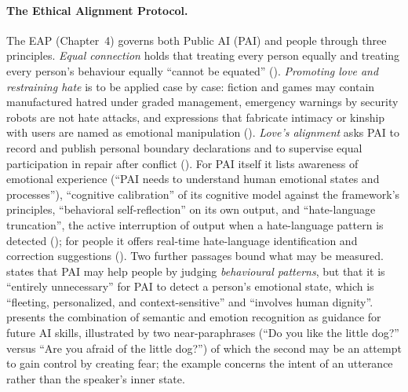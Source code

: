 \paragraph{The Ethical Alignment Protocol.}
The EAP (Chapter~4) governs both Public AI (PAI) and people through three principles.
\emph{Equal connection} holds that treating every person equally and treating every person's behaviour equally ``cannot be equated'' ().
\emph{Promoting love and restraining hate} is to be applied case by case: fiction and games may contain manufactured hatred under graded management, emergency warnings by security robots are not hate attacks, and expressions that fabricate intimacy or kinship with users are named as emotional manipulation ().
\emph{Love's alignment} asks PAI to record and publish personal boundary declarations and to supervise equal participation in repair after conflict ().
For PAI itself it lists awareness of emotional experience (``PAI needs to understand human emotional states and processes''), ``cognitive calibration'' of its cognitive model against the framework's principles, ``behavioral self-reflection'' on its own output, and ``hate-language truncation'', the active interruption of output when a hate-language pattern is detected (); for people it offers real-time hate-language identification and correction suggestions ().
Two further passages bound what may be measured.
 states that PAI may help people by judging \emph{behavioural patterns}, but that it is ``entirely unnecessary'' for PAI to detect a person's emotional state, which is ``fleeting, personalized, and context-sensitive'' and ``involves human dignity''.
 presents the combination of semantic and emotion recognition as guidance for future AI skills, illustrated by two near-paraphrases (``Do you like the little dog?'' versus ``Are you afraid of the little dog?'') of which the second may be an attempt to gain control by creating fear; the example concerns the intent of an utterance rather than the speaker's inner state.

